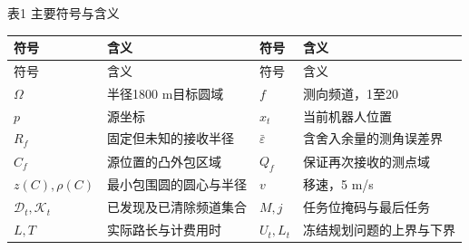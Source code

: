 \Needspace{38mm}
\begin{center}\small 表1 主要符号与含义\end{center}
\nopagebreak
\begin{longtable}[]{@{}
  >{\raggedright\arraybackslash}p{}
  >{\raggedright\arraybackslash}p{}
  >{\raggedright\arraybackslash}p{}
  >{\raggedright\arraybackslash}p{}@{}}

\toprule\noalign{}
\begin{minipage}[b]{\linewidth}\raggedright
符号
\end{minipage} & \begin{minipage}[b]{\linewidth}\raggedright
含义
\end{minipage} & \begin{minipage}[b]{\linewidth}\raggedright
符号
\end{minipage} & \begin{minipage}[b]{\linewidth}\raggedright
含义
\end{minipage} \\
\midrule\noalign{}
\endfirsthead
\toprule\noalign{}
\begin{minipage}[b]{\linewidth}\raggedright
符号
\end{minipage} & \begin{minipage}[b]{\linewidth}\raggedright
含义
\end{minipage} & \begin{minipage}[b]{\linewidth}\raggedright
符号
\end{minipage} & \begin{minipage}[b]{\linewidth}\raggedright
含义
\end{minipage} \\
\midrule\noalign{}
\endhead
\bottomrule\noalign{}
\endlastfoot
\(\Omega\) & 半径1800 m目标圆域 & \(f\) & 测向频道，1至20 \\
\(p\) & 源坐标 & \(x_t\) & 当前机器人位置 \\
\(R_f\) & 固定但未知的接收半径 & \(\bar\varepsilon\) & 含舍入余量的测角误差界 \\
\(\widehat C_f\) & 源位置的凸外包区域 & \(Q_f\) & 保证再次接收的测点域 \\
\(z(C),\rho(C)\) & 最小包围圆的圆心与半径 & \(v\) & 移速，5 m/s \\
\(\mathcal D_t,\mathcal K_t\) & 已发现及已清除频道集合 & \(M,j\) & 任务位掩码与最后任务 \\
\(L,T\) & 实际路长与计费用时 & \(U_t,L_t\) & 冻结规划问题的上界与下界 \\
\end{longtable}

